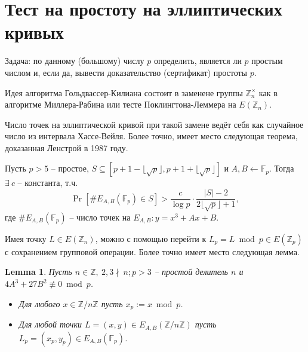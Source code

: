 \documentclass[11pt]{exam}
\newtheorem{lemma}[theorem]{Lemma}
\theoremstyle{definition}
\newcommand*{\structure}[1]{\textcolor{struct-color}{#1}}
\begin{document}
{\section{Тест на простоту на эллиптических кривых}
\structure{Задача:} по данному (большому) числу $p$ определить, является ли $p$ простым числом и, если да, вывести доказательство (\structure{сертификат}) простоты $p$.

Идея алгоритма Гольдвассер-Килиана состоит в заменене группы $\mathbb{Z}_n^\times$ как в алгоритме Миллера-Рабина или тесте
Поклингтона-Леммера на $E(\mathbb{Z}_n)$.

Число точек на эллиптической кривой при такой замене ведёт себя как случайное число из интервала Хассе-Вейля. Более точно, имеет место следующая теорема, доказанная Ленстрой в 1987 году.
\begin{center}
	\begin{tcolorbox}[enhanced,hbox,colback=title-and-section-color!5,colframe=title-and-section-color!120,title= Теорема о распределении порядков случайных ЭК,center title]
		\begin{varwidth}{\textwidth}
			\begin{center}
				Пусть $p>5$ -- простое, $S \subseteq [ p+1-\lfloor\sqrt{p}\rfloor, p+1+\lfloor\sqrt{p}\rfloor ]$ и $A, B \leftarrow \mathbb{F}_p$. Тогда $\exists\ c$ -- константа, т.ч.
				\[
				\Pr\left[\#E_{A,B}(\mathbb{F}_p) \in S \right] > \frac{c}{\log p} \cdot \frac{|S|-2}{2\lfloor\sqrt{p}\rfloor + 1},
				\]
				где $\#E_{A,B}(\mathbb{F}_p)$ -- число точек на $E_{A,B}: y = x^3 + Ax+B$.
			\end{center}
		\end{varwidth}
	\end{tcolorbox}	
\end{center}

Имея точку $L \in E(\mathbb{Z}_n)$, можно с помощью перейти к $L_p = L \bmod{p} \in E(\mathbb{Z}_p)$ с сохранением групповой операции. Более точно имеет место следующая лемма. 
\begin{lemma}
\label{lemma:points_En_to_Ep}
Пусть $n \in \mathbb{Z},\ 2,3\nmid \ n; p>3$ -- простой делитель $n$ и $4A^3 + 27B^2 \not\equiv 0\bmod p$.
\begin{itemize}
	\item Для любого $x \in \mathbb{Z}/n\mathbb{Z}$ пусть $x_p := x\bmod p$.
	\item Для любой точки $L = (x,y) \in E_{A,B}( \mathbb{Z}/n\mathbb{Z})$ пусть $L_p = (x_p, y_p) \in E_{A,B}(\mathbb{F}_p)$.  %
\end{itemize}  


\end{lemma}}
\end{document}
